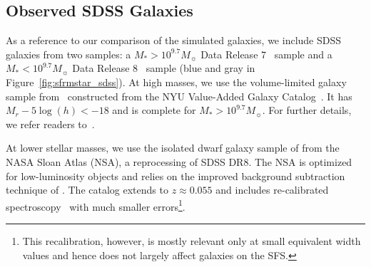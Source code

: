 \documentclass[tighten, preprint]{aastex62}
\begin{document}
\subsection{Observed SDSS Galaxies} \label{sec:obvs}
As a reference to our comparison of the simulated galaxies,  %
we include SDSS galaxies from two samples: a 
$M_*{>}10^{9.7} M_\sun$ Data Release 7~\citep[DR7;][]{abazajian2009} sample 
and a $M_* < 10^{9.7} M_\sun$ Data Release 8~\citep[DR8;][]{aihara2011} sample
(blue and gray in Figure~\ref{fig:sfrmstar_sdss}). 
At high masses, we use the volume-limited galaxy sample 
from~\cite{tinker2011} constructed from the NYU Value-Added Galaxy 
Catalog~\citep[VAGC;][]{blanton2005}. It has $M_r - 5\log(h) < -18$
and is complete for $M_* > 10^{9.7} M_\sun$. For further details, 
we refer readers to~\cite{tinker2011,wetzel2013,hahn2017b}. 

At lower stellar masses, we use the isolated dwarf galaxy sample 
of \citet{geha2012} from the NASA Sloan Atlas (NSA), a reprocessing 
of SDSS DR8. The NSA is optimized for low-luminosity objects and 
relies on the improved background subtraction technique of 
\cite{blanton2011}. The catalog extends to $z{\approx}0.055$ and 
includes re-calibrated spectroscopy~\citep{yan2011,yan2012} 
with much smaller errors\footnote{This recalibration, however, is mostly 
relevant only at small equivalent width values and hence does not 
largely affect galaxies on the SFS.}.%
\end{document}
